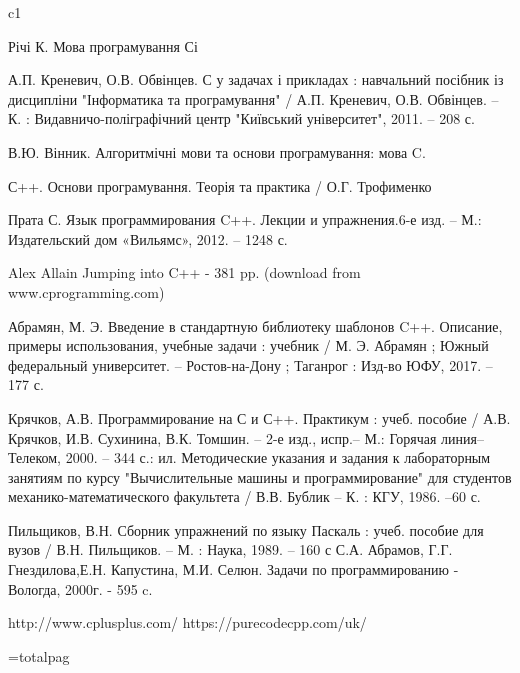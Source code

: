 \documentclass[a5paper,titlepage,openany,twoside,draft]{book_unv}%
\begin{document}
\begin{thebibliography} {c1}

 Річі К. Мова програмування Сі 

 А.П. Креневич, О.В. Обвінцев. С у задачах і прикладах : навчальний посібник із дисципліни "Інформатика та програмування" / А.П. Креневич, О.В. Обвінцев. – К. : Видавничо-поліграфічний центр "Київський університет", 2011. – 208 с.

 В.Ю. Вінник. Алгоритмічні мови та основи програмування: мова C. 

С++. Основи програмування. Теорія та практика / О.Г. Трофименко 

Прата С. Язык программирования C++. Лекции и упражнения.6-е изд. – М.: Издательский дом «Вильямс», 2012. – 1248 с.

Alex Allain  Jumping into C++ - 381 pp. (download from www.cprogramming.com)

Абрамян, М. Э. Введение в стандартную библиотеку шаблонов C++. Описание, примеры использования, учебные задачи : учебник / М. Э. Абрамян ; Южный федеральный университет. – Ростов-на-Дону ; Таганрог : Изд-во ЮФУ, 2017. – 177 с.

Крячков, А.В. Программирование на С и С++. Практикум : учеб. пособие / А.В. Крячков, И.В. Сухинина, В.К. Томшин. – 2-е изд., испр.– М.: Горячая линия–Телеком, 2000. – 344 с.: ил.
Методические указания и задания к лабораторным занятиям по курсу "Вычислительные машины и программирование" для студентов механико-математического факультета / В.В. Бублик – К. : КГУ, 1986. –60 с.

Пильщиков, В.Н. Сборник упражнений по языку Паскаль : учеб. пособие для вузов / В.Н. Пильщиков. – М. : Наука, 1989. – 160 с
С.А. Абрамов, Г.Г. Гнездилова,Е.Н. Капустина, М.И. Селюн. Задачи по программированию - Вологда, 2000г. - 595 c.

http://www.cplusplus.com/
https://purecodecpp.com/uk/

\end{thebibliography}

=totalpag
\end{document}
